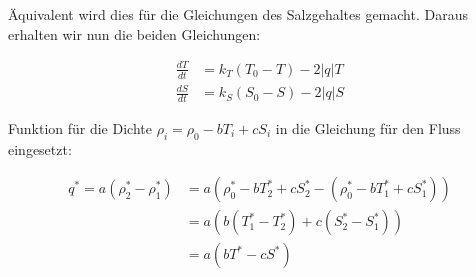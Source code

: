 \documentclass[a4paper,twoside]{article}
\begin{document}
	\noindent Äquivalent wird dies für die Gleichungen des Salzgehaltes gemacht. Daraus erhalten wir nun die beiden Gleichungen:
	\begin{footnotesize}
	\begin{align*}
		\frac{dT}{dt} &= k_T\left(T_{0} - T\right) - 2\left|q\right|T \\		
		\frac{dS}{dt} &= k_S\left(S_{0} - S\right) - 2\left|q\right|S
	\end{align*}
	\end{footnotesize}

	\noindent Funktion für die Dichte \(\rho_i = \rho_0 - bT_i + cS_i\) in die Gleichung für den Fluss eingesetzt:
	\begin{footnotesize}
	\begin{align*}
		q^* = a\left( \rho^*_2 - \rho^*_1 \right) &=
		a \left( 
			\rho^*_0 - bT^*_2 + cS^*_2 -
			\left( \rho^*_0 - bT^*_1 + cS^*_1 \right)
		\right) \\
		&= a \left( b \left(T^*_1 - T^*_2\right) + c \left( S^*_2 - S^*_1 \right) \right) \\
		&= a \left( bT^* - cS^* \right)
	\end{align*}
	\end{footnotesize}
	
\end{document}
